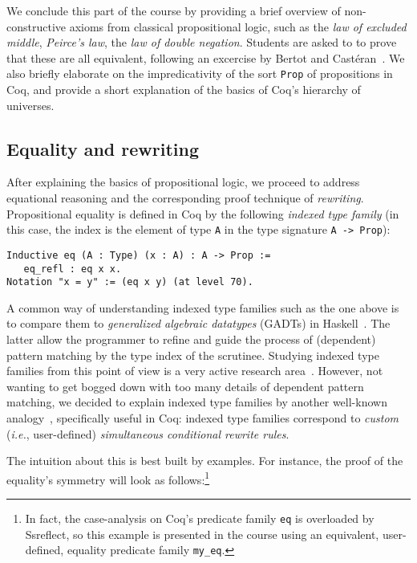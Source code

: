 \documentclass[blockstyle,preprint]{sigplanconf}
\newcommand{\is}[1]{\textcolor{blue}{(Ilya: {#1})}}
\newcommand{\code}[1]{\lstinline{#1}}
\newcommand{\ie}{\emph{i.e.}\xspace}
\begin{document}
We conclude this part of the course by providing a brief overview of
non-constructive axioms from classical propositional logic, such as
the \emph{law of excluded middle}, \emph{Peirce's law}, the \emph{law
  of double negation}. Students are asked to to prove that these are
all equivalent, following an excercise by Bertot and
Cast\'{e}ran~\cite{Bertot-Casteran:BOOK}. We also briefly elaborate on
the impredicativity of the sort \code{Prop} of propositions in Coq,
and provide a short explanation of the basics of Coq's hierarchy of
universes.

\subsection{Equality and rewriting}
\label{sec:rewriting}

After explaining the basics of propositional logic, we proceed to
address equational reasoning and the corresponding proof technique of
\emph{rewriting}. Propositional equality is defined in Coq by the
following \emph{indexed type family} (in this case, the index is the
element of type \code{A} in the type signature \code{A -> Prop}):
%
\begin{lstlisting}
Inductive eq (A : Type) (x : A) : A -> Prop :=  
   eq_refl : eq x x.
Notation "x = y" := (eq x y) (at level 70).
\end{lstlisting}
%
A common way of understanding indexed type families such as the one
above is to compare them to \emph{generalized algebraic datatypes}
(GADTs) in Haskell~\cite{PeytonJones-al:ICFP06,Xi-al:POPL03}. The
latter allow the programmer to refine and guide the process of
(dependent) pattern matching by the type index of the
scrutinee. Studying indexed type families from this point of view is a
very active research
area~\cite{Morris-al:FCS09,Dagand-McBride:ICFP12}.
%
However, not wanting to get bogged down with too many details of
dependent pattern matching, we decided to explain indexed type
families by another well-known analogy~\cite{Paulin-Mohring:TLCA93},
%
%
specifically useful in Coq: indexed type families correspond to
\emph{custom} (\ie, user-defined) \emph{simultaneous conditional
  rewrite rules}.

The intuition about this is best built by examples. For instance, the
proof of the equality's symmetry will look as follows:\footnote{In
  fact, the case-analysis on Coq's predicate family \code{eq} is
  overloaded by Ssreflect, so this example is presented in the course
  using an equivalent, user-defined, equality predicate family
  \code{my_eq}.}
\end{document}
